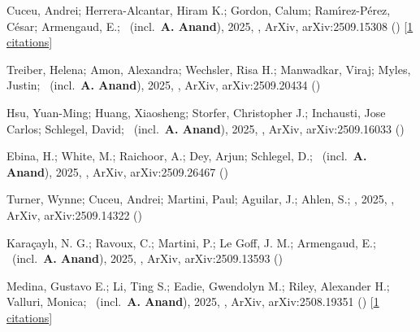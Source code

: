 \item[{\color{numcolor}\scriptsize12}] Cuceu, Andrei; Herrera-Alcantar, Hiram K.; Gordon, Calum; Ram{\'\i}rez-P{\'e}rez, C{\'e}sar; Armengaud, E.; \etal\ (incl.\ \textbf{A. Anand}), 2025, , ArXiv, arXiv:2509.15308 () [\href{https://ui.adsabs.harvard.edu/abs/2025arXiv250915308C}{1 citations}]

\item[{\color{numcolor}\scriptsize11}] Treiber, Helena; Amon, Alexandra; Wechsler, Risa H.; Manwadkar, Viraj; Myles, Justin; \etal\ (incl.\ \textbf{A. Anand}), 2025, , ArXiv, arXiv:2509.20434 ()

\item[{\color{numcolor}\scriptsize10}] Hsu, Yuan-Ming; Huang, Xiaosheng; Storfer, Christopher J.; Inchausti, Jose Carlos; Schlegel, David; \etal\ (incl.\ \textbf{A. Anand}), 2025, , ArXiv, arXiv:2509.16033 ()

\item[{\color{numcolor}\scriptsize9}] Ebina, H.; White, M.; Raichoor, A.; Dey, Arjun; Schlegel, D.; \etal\ (incl.\ \textbf{A. Anand}), 2025, , ArXiv, arXiv:2509.26467 ()

\item[{\color{numcolor}\scriptsize8}] Turner, Wynne; Cuceu, Andrei; Martini, Paul; Aguilar, J.; Ahlen, S.; \etal, 2025, , ArXiv, arXiv:2509.14322 ()

\item[{\color{numcolor}\scriptsize7}] Kara{\c{c}}ayl{\i}, N. G.; Ravoux, C.; Martini, P.; Le Goff, J. M.; Armengaud, E.; \etal\ (incl.\ \textbf{A. Anand}), 2025, , ArXiv, arXiv:2509.13593 ()

\item[{\color{numcolor}\scriptsize6}] Medina, Gustavo E.; Li, Ting S.; Eadie, Gwendolyn M.; Riley, Alexander H.; Valluri, Monica; \etal\ (incl.\ \textbf{A. Anand}), 2025, , ArXiv, arXiv:2508.19351 () [\href{https://ui.adsabs.harvard.edu/abs/2025arXiv250819351M}{1 citations}]

